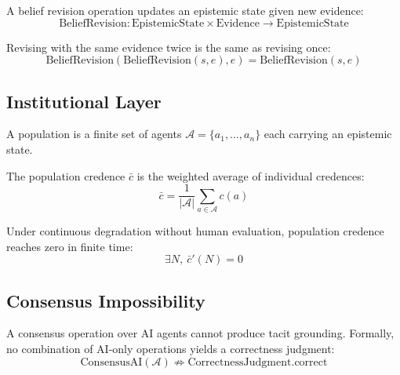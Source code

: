 \begin{definition}
A belief revision operation updates an epistemic state given new evidence:
\[
  \mathrm{BeliefRevision} : \mathrm{EpistemicState} \times \mathrm{Evidence}
                           \to \mathrm{EpistemicState}
\]
\end{definition}

\begin{axiom_env}
Revising with the same evidence twice is the same as revising once:
\[
  \mathrm{BeliefRevision}(\mathrm{BeliefRevision}(s, e), e)
  = \mathrm{BeliefRevision}(s, e)
\]
\end{axiom_env}

\subsection{Institutional Layer}

\begin{definition}[Population]
A population is a finite set of agents $\mathcal{A} = \{a_1, \ldots, a_n\}$
each carrying an epistemic state.
\end{definition}

\begin{definition}
The population credence $\bar{c}$ is the weighted average of individual
credences:
\[
  \bar{c} = \frac{1}{|\mathcal{A}|}\sum_{a \in \mathcal{A}} c(a)
\]
\end{definition}

\begin{theorem}
Under continuous degradation without human evaluation, population credence
reaches zero in finite time:
\[
  \exists N,\ \bar{c}'(N) = 0
\]
\end{theorem}

\subsection{Consensus Impossibility}

\begin{theorem}
A consensus operation over AI agents cannot produce tacit grounding. Formally,
no combination of AI-only operations yields a correctness judgment:
\[
  \mathrm{ConsensusAI}(\mathcal{A})
  \not\Rightarrow
  \mathrm{CorrectnessJudgment.correct}
\]
\end{theorem}


